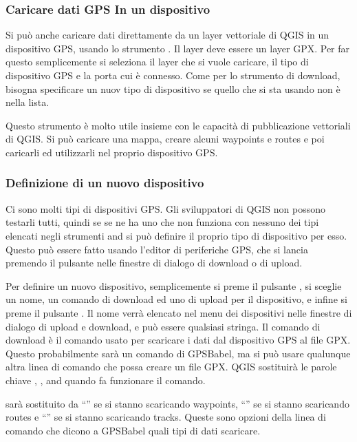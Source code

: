 \subsubsection{Caricare dati GPS In un dispositivo}

Si può anche caricare dati direttamente da un layer vettoriale di QGIS in un dispositivo GPS, usando lo strumento .
Il layer deve essere un layer GPX.
Per far questo semplicemente si seleziona il layer che si vuole caricare, il tipo di dispositivo GPS e la porta cui è connesso.
Come per lo strumento di download, bisogna specificare un nuov tipo di dispositivo se quello che si sta usando non è nella lista.

Questo strumento è molto utile insieme con le capacità di pubblicazione vettoriali di QGIS.
Si può caricare una mappa, creare alcuni waypoints e routes e poi caricarli ed utilizzarli nel proprio dispositivo GPS.

\subsubsection{\label{sec:Defining-new-device}Definizione di un nuovo dispositivo}

Ci sono molti tipi di dispositivi GPS.
Gli sviluppatori di QGIS non possono testarli tutti, quindi se se ne ha uno che non funziona con nessuno dei tipi elencati negli strumenti  and  si può definire il proprio tipo di dispositivo per esso.
Questo può essere fatto usando l'editor di periferiche GPS, che si lancia premendo il pulsante  nelle finestre di dialogo di download o di upload.

Per definire un nuovo dispositivo, semplicemente si preme il pulsante , si sceglie un nome, un comando di download ed uno di upload per il dispositivo, e infine si preme il pulsante .
Il nome verrà elencato nel menu dei dispositivi nelle finestre di dialogo di upload e download, e può essere qualsiasi stringa.
Il comando di download è il comando usato per scaricare i dati dal dispositivo GPS al file GPX.
Questo probabilmente sarà un comando di GPSBabel, ma si può usare qualunque altra linea di comando che possa creare un file GPX.
QGIS sostituirà le parole chiave , , and  quando fa funzionare il comando.

 sarà sostituito da {}``'' se si stanno scaricando waypoints, {}``'' se si stanno scaricando routes e {}``'' se si stanno scaricando tracks.
Queste sono opzioni della linea di comando che dicono a GPSBabel quali tipi di dati scaricare.

